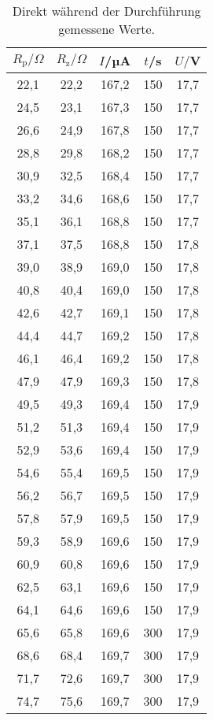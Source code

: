 \begin{table}[htp]
	\begin{center}
    \caption{Direkt während der Durchführung gemessene Werte.}
    \label{tab:messwerte}
		\begin{tabular}{ccccc}
    		\toprule
			{$R_\text{p}/\Omega$} & {$R_\text{z}/\Omega$} & {$I$/µA} & {$t$/s} & {$U/$V}\\
			\midrule
			22,1 & 22,2 & 167,2 & 150 & 17,7\\
			24,5 & 23,1 & 167,3 & 150 & 17,7\\
			26,6 & 24,9 & 167,8 & 150 & 17,7\\
			28,8 & 29,8 & 168,2 & 150 & 17,7\\
			30,9 & 32,5 & 168,4 & 150 & 17,7\\
			33,2 & 34,6 & 168,6 & 150 & 17,7\\
			35,1 & 36,1 & 168,8 & 150 & 17,7\\
			37,1 & 37,5 & 168,8 & 150 & 17,8\\
			39,0 & 38,9 & 169,0 & 150 & 17,8\\
			40,8 & 40,4 & 169,0 & 150 & 17,8\\
			42,6 & 42,7 & 169,1 & 150 & 17,8\\
			44,4 & 44,7 & 169,2 & 150 & 17,8\\
			46,1 & 46,4 & 169,2 & 150 & 17,8\\
			47,9 & 47,9 & 169,3 & 150 & 17,8\\
			49,5 & 49,3 & 169,4 & 150 & 17,9\\
			51,2 & 51,3 & 169,4 & 150 & 17,9\\
			52,9 & 53,6 & 169,4 & 150 & 17,9\\
			54,6 & 55,4 & 169,5 & 150 & 17,9\\
			56,2 & 56,7 & 169,5 & 150 & 17,9\\
			57,8 & 57,9 & 169,5 & 150 & 17,9\\
			59,3 & 58,9 & 169,6 & 150 & 17,9\\
			60,9 & 60,8 & 169,6 & 150 & 17,9\\
			62,5 & 63,1 & 169,6 & 150 & 17,9\\
			64,1 & 64,6 & 169,6 & 150 & 17,9\\
			65,6 & 65,8 & 169,6 & 300 & 17,9\\
			68,6 & 68,4 & 169,7 & 300 & 17,9\\
			71,7 & 72,6 & 169,7 & 300 & 17,9\\
			74,7 & 75,6 & 169,7 & 300 & 17,9\\

\end{tabular}
\end{center}
\end{table}
